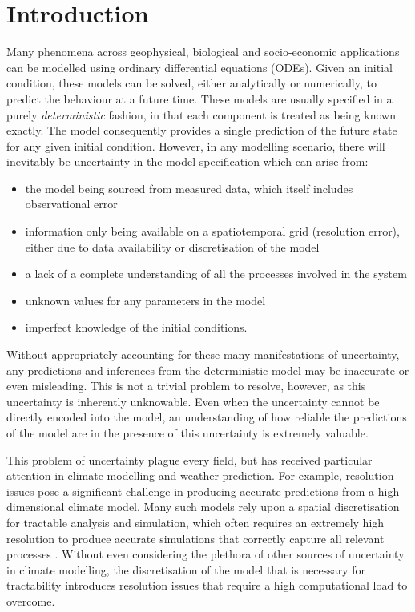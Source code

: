 
\chapter{Introduction}\label{ch:intro}
Many phenomena across geophysical, biological and socio-economic applications can be modelled using ordinary differential equations (ODEs).
Given an initial condition, these models can be solved, either analytically or numerically, to predict the behaviour at a future time.
These models are usually specified in a purely \emph{deterministic} fashion, in that each component is treated as being known exactly.
The model consequently provides a single prediction of the future state for any given initial condition.
However, in any modelling scenario, there will inevitably be uncertainty in the model specification which can arise from:
\begin{itemize}
	\item the model being sourced from measured data, which itself includes observational error
	\item information only being available on a spatiotemporal grid (resolution error), either due to data availability or discretisation of the model
	\item a lack of a complete understanding of all the processes involved in the system
	\item unknown values for any parameters in the model
	\item imperfect knowledge of the initial conditions.
\end{itemize}
Without appropriately accounting for these many manifestations of uncertainty, any predictions and inferences from the deterministic model may be inaccurate or even misleading.
This is not a trivial problem to resolve, however, as this uncertainty is inherently unknowable.
Even when the uncertainty cannot be directly encoded into the model, an understanding of how reliable the predictions of the model are in the presence of this uncertainty is extremely valuable.

This problem of uncertainty plague every field, but has received particular attention in climate modelling and weather prediction.
For example, resolution issues pose a significant challenge in producing accurate predictions from a high-dimensional climate model.
Many such models rely upon a spatial discretisation for tractable analysis and simulation, which often requires an extremely high resolution to produce accurate simulations that correctly capture all relevant processes \citep{DawsonEtAl_2012_SimulatingRegimeStructures}.
Without even considering the plethora of other sources of uncertainty in climate modelling, the discretisation of the model that is necessary for tractability introduces resolution issues that require a high computational load to overcome.


